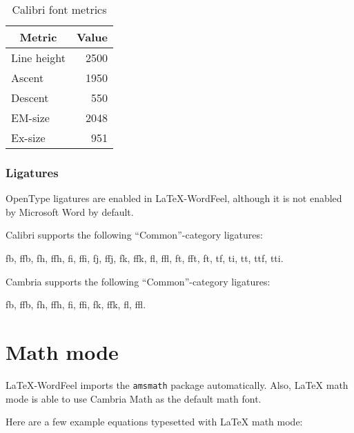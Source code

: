 \documentclass[letterpaper]{wordfeel}
\begin{document}
\begin{table}[htb]
    \centering
    \caption{Calibri font metrics}
    \label{tab:font-metrics}
    \begin{tabular}{lr}
        \toprule
        \multicolumn{1}{c}{Metric} & \multicolumn{1}{c}{Value}\\
        \midrule
        Line height & 2500 \\
        Ascent & 1950 \\
        Descent & 550 \\
        EM-size & 2048 \\
        Ex-size & 951 \\
        \bottomrule
    \end{tabular}
\end{table}

\FloatBarrier

\subsubsection{Ligatures}

OpenType ligatures are enabled in \LaTeX-WordFeel, although it is not enabled by Microsoft Word by default.

Calibri supports the following ``Common''-category ligatures:

{\LARGE fb, ffb, fh, ffh, fi, ffi, fj, ffj, fk, ffk, fl, ffl, ft, fft, ft, tf, ti, tt, ttf, tti.}

\textrm{Cambria} supports the following ``Common''-category ligatures:

{\LARGE\rmfamily fb, ffb, fh, ffh, fi, ffi, fk, ffk, fl, ffl.}

\section{Math mode}

\LaTeX-WordFeel imports the \texttt{amsmath} package automatically. Also, \LaTeX{} math mode is able to use \textrm{Cambria Math} as the default math font.

Here are a few example equations typesetted with \LaTeX{} math mode:
\end{document}
